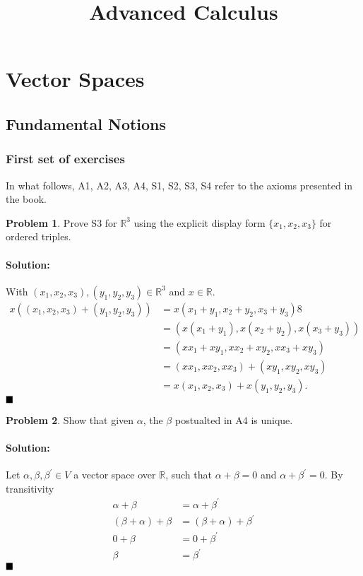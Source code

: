 \documentclass[]{article}
\title{Advanced Calculus}
\author{}
\date{}
\newcommand{\RR}{\mathbb{R}}
\theoremstyle{definition}
\newtheorem{problem}{Problem}
\newenvironment{solution}{\paragraph{Solution:}}{\hfill$\blacksquare \\$}
\begin{document}
\maketitle
\newpage
\tableofcontents
\newpage

\section{Vector Spaces}
\subsection{Fundamental Notions}
\subsubsection{First set of exercises}
In what follows, A1, A2, A3, A4, S1, S2, S3, S4 refer to the axioms presented in the book.
\begin{problem}
	Prove S3 for $\RR^3$ using the explicit display form $\{x_1, x_2, x_3\}$ for ordered triples.
\end{problem}
\begin{solution}

With $(x_1, x_2, x_3), (y_1, y_2, y_3) \in \RR^3$ and $x \in \RR$. 
	\begin{align*} 
		x((x_1, x_2, x_3) + (y_1, y_2, y_3)) &= x(x_1 + y_1, x_2 + y_2, x_3 + y_3) 8 \\ 
	 &=  (x(x_1 + y_1), x(x_2 + y_2), x(x_3 + y_3)) \\
	 &= (xx_1 + xy_1, xx_2 + xy_2, xx_3 + xy_3) \\
	 &= (xx_1, xx_2, xx_3) + (xy_1, xy_2, xy_3) \\
	 &= x(x_1, x_2, x_3) + x(y_1, y_2, y_3).
	\end{align*}
\end{solution}
\begin{problem}
	Show that given $\alpha$, the $\beta$ postualted in A4 is unique.
\end{problem}
\begin{solution}
	Let $\alpha, \beta, \beta^\prime \in V$ a vector space over $\RR$, such that $\alpha + \beta = 0$ and $\alpha + \beta^\prime = 0$. By transitivity
	\begin{align*}
		\alpha + \beta &= \alpha + \beta^\prime \\
		(\beta + \alpha) + \beta &= (\beta + \alpha) + \beta^\prime \\
		0 + \beta &= 0 + \beta^\prime \\
		\beta &= \beta^\prime
	\end{align*}
\end{solution}
\end{document}
